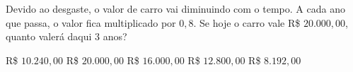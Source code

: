 Devido ao desgaste, o valor de carro vai diminuindo com o tempo. A cada ano que passa, o valor fica multiplicado por $0{,}8$. Se hoje o carro vale R\$ $20.000{,}00$, quanto valerá daqui $3$ anos?

R\$ $10.240{,}00$
R\$ $20.000{,}00$
R\$ $16.000{,}00$
R\$ $12.800{,}00$
R\$ $8.192{,}00$


